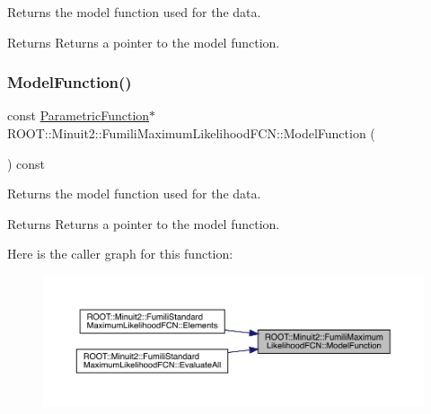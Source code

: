 Returns the model function used for the data.

\begin{DoxyReturn}{Returns}
Returns a pointer to the model function. 
\end{DoxyReturn}
\mbox{\label{classROOT_1_1Minuit2_1_1FumiliMaximumLikelihoodFCN_ae1ea41126186d9dd5c83fdcec08cff70}} 
\subsubsection{\texorpdfstring{ModelFunction()}{ModelFunction()}\hspace{0.1cm}{\footnotesize\ttfamily [2/2]}}
{\footnotesize\ttfamily const \mbox{\hyperlink{classROOT_1_1Minuit2_1_1ParametricFunction}{Parametric\+Function}}$\ast$ R\+O\+O\+T\+::\+Minuit2\+::\+Fumili\+Maximum\+Likelihood\+F\+C\+N\+::\+Model\+Function (\begin{DoxyParamCaption}{ }\end{DoxyParamCaption}) const\hspace{0.3cm}{\ttfamily [inline]}}

Returns the model function used for the data.

\begin{DoxyReturn}{Returns}
Returns a pointer to the model function. 
\end{DoxyReturn}
Here is the caller graph for this function\+:\nopagebreak
\begin{figure}[H]
\begin{center}
\leavevmode
\includegraphics[width=350pt]{dd/d54/classROOT_1_1Minuit2_1_1FumiliMaximumLikelihoodFCN_ae1ea41126186d9dd5c83fdcec08cff70_icgraph}
\end{center}
\end{figure}
\mbox{\label{classROOT_1_1Minuit2_1_1FumiliMaximumLikelihoodFCN_ad06826a1cde84be6bf2a13518c768ca5}} 
